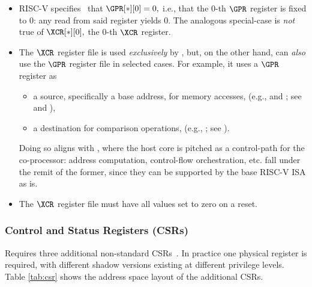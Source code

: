 \begin{itemize}
\item RISC-V specifies~\cite[Section 2.1]{SCARV:RV:ISA:I:17} that
      $
      \GPR[*][0] = 0 ,
      $
      i.e., that the $0$-th $\GPR$ register is fixed to $0$: any read from 
      said register yields $0$.  The analogous special-case is {\em not} 
      true of 
      $
      \XCR[*][0] ,
      $
      the $0$-th $\XCR$ register.
\item The $\XCR$ register file is used {\em exclusively} by \XCID, but, on
      the other hand, \XCID can {\em also} use the $\GPR$ register file in 
      selected cases.  For example, it uses a $\GPR$ register as

      \begin{itemize}
      \item a source, specifically a base address, for memory accesses,
            (e.g.,  and ; see  and ),
      \item a destination for comparison operations,
            (e.g., ; see ).
      \end{itemize}

      \noindent
      Doing so aligns with , where the host core is 
      pitched as a control-path for the co-processor: address computation,
      control-flow orchestration, etc. fall under the remit of the former, 
      since they can be supported by the base RISC-V ISA as is.
\item The $\XCR$ register file must have all values set to zero on a reset.
\end{itemize}    


\subsubsection{Control and Status Registers (CSRs)}
\label{sec:spec:state:csr}

\XCID 
Requires three additional
non-standard CSRs~\cite[Section 2]{SCARV:RV:ISA:II:17}.
In practice one physical register is required, with different shadow
versions existing at different privilege levels.
Table \ref{tab:csr} shows the address space layout of the additional
CSRs.

